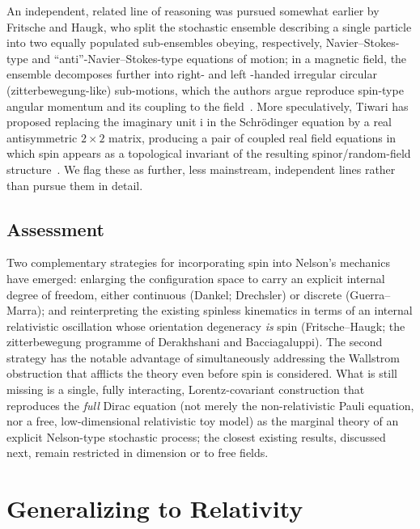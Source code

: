 \documentclass[11pt]{article}
\newcommand{\ii}{\mathrm{i}}
\begin{document}
An independent, related line of reasoning was pursued somewhat earlier by
Fritsche and Haugk, who split the stochastic ensemble describing a single
particle into two equally populated sub-ensembles obeying, respectively,
Navier--Stokes-type and ``anti''-Navier--Stokes-type equations of motion;
in a magnetic field, the ensemble decomposes further into right- and left
-handed irregular circular (zitterbewegung-like) sub-motions, which the
authors argue reproduce spin-type angular momentum and its coupling to the
field~\cite{fritschehaugk09}. More speculatively, Tiwari has proposed
replacing the imaginary unit $\ii$ in the Schr\"odinger equation by a real
antisymmetric $2\times2$ matrix, producing a pair of coupled real field
equations in which spin appears as a topological invariant of the resulting
spinor/random-field structure~\cite{tiwari19}. We flag these as further,
less mainstream, independent lines rather than pursue them in detail.

\subsection{Assessment}

Two complementary strategies for incorporating spin into Nelson's mechanics
have emerged: enlarging the configuration space to carry an explicit
internal degree of freedom, either continuous (Dankel; Drechsler) or
discrete (Guerra--Marra); and reinterpreting the existing spinless
kinematics in terms of an internal relativistic oscillation whose
orientation degeneracy \emph{is} spin (Fritsche--Haugk; the zitterbewegung
programme of Derakhshani and Bacciagaluppi). The second strategy has the
notable advantage of simultaneously addressing the Wallstrom obstruction
that afflicts the theory even before spin is considered. What is still
missing is a single, fully interacting, Lorentz-covariant construction that
reproduces the \emph{full} Dirac equation (not merely the non-relativistic
Pauli equation, nor a free, low-dimensional relativistic toy model) as the
marginal theory of an explicit Nelson-type stochastic process; the closest
existing results, discussed next, remain restricted in dimension or to free
fields.

\section{Generalizing to Relativity}\label{sec:relativity}
\end{document}
